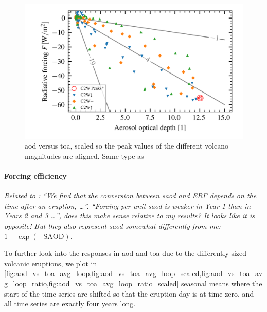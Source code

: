 \documentclass[twocol]{ametsocV5}
\begin{document}
\begin{figure}
  \begin{center}
    \includegraphics[width=0.95\linewidth]{figures/aod_vs_toa_avg_scaled.png}
  \end{center}
  \caption{
    \acrshort{aod} versus \acrshort{toa}, scaled so the peak values of the different
    volcano magnitudes are aligned. Same type as \citet{gregory2016}
  }%
  \label{fig:aod_vs_toa_scaled}
\end{figure}

\paragraph{Forcing efficiency}

\emph{Related to \citet{marshall2020}: ``We find that the conversion between
  \acrshort{saod} and ERF depends on the time after an eruption, \dots''. ``Forcing per
  unit \acrshort{saod} is weaker in Year 1 than in Years 2 and 3 \dots'', does this make
  sense relative to my results? It looks like it is opposite! But they also represent
  \acrshort{saod} somewhat differently from me: \( 1-\exp(-\mathrm{SAOD}) \).}

To further look into the responses in \acrshort{aod} and \acrshort{toa} due to the
differently sized volcanic eruptions, we plot in
\cref{fig:aod_vs_toa_avg_loop,fig:aod_vs_toa_avg_loop_scaled,fig:aod_vs_toa_avg_loop_ratio,fig:aod_vs_toa_avg_loop_ratio_scaled}
seasonal means where the start of the time series are shifted so that the eruption day
is at time zero, and all time series are exactly four years long.
\end{document}
